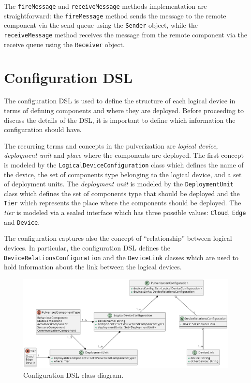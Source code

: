 The \texttt{fireMessage} and \texttt{receiveMessage} methods implementation are straightforward: the \texttt{fireMessage} method sends the message
to the remote component via the send queue using the \texttt{Sender} object, while the \texttt{receiveMessage} method receives the message from the
remote component via the receive queue using the \texttt{Receiver} object.


\section{Configuration DSL}
\label{sec:configuration-dsl-impl}


The configuration DSL is used to define the structure of each logical device in terms of defining components and where they are deployed.
Before proceeding to discuss the details of the DSL, it is important to define which information the configuration should have.

The recurring terms and concepts in the pulverization are \emph{logical device}, \emph{deployment unit} and \emph{place} where the components are
deployed. The first concept is modeled by the \texttt{LogicalDeviceConfiguration} class which defines the name of the device, the set of components
type belonging to the logical device, and a set of deployment units.
The \emph{deployment unit} is modeled by the \texttt{DeploymentUnit} class which defines the set of components type that should be deployed and the
\texttt{Tier} which represents the place where the components should be deployed. The \emph{tier} is modeled via a sealed interface which has
three possible values: \texttt{Cloud}, \texttt{Edge} and \texttt{Device}.

The configuration captures also the concept of ``relationship'' between logical devices. In particular, the configuration DSL defines
the \texttt{Device\-Relations\-Configuration} and the \texttt{DeviceLink} classes which are used to hold information about the link between the logical devices.

\begin{figure}[ht]
	\centering
	\includegraphics[width=\textwidth]{figures/config-dsl-class.pdf}
	\caption{Configuration DSL class diagram.}
	\label{fig:configuration-dsl-classes}
\end{figure}

